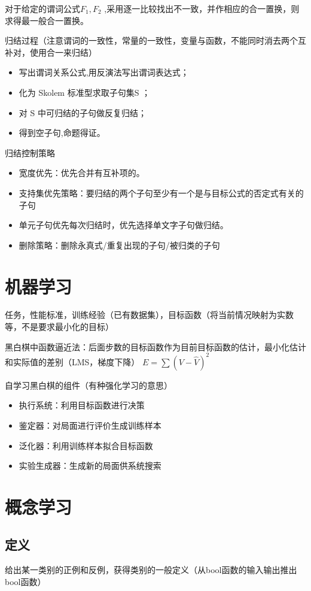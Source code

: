 \documentclass[UTF8,a4paper,landscape,16pt]{paper}
\begin{document}
\begin{multicols}{4}
\noindent 对于给定的谓词公式$F_{1},F_{2}$ ,采用逐一比较找出不一致，并作相应的合一置换，则求得最一般合一置换。

\noindent 归结过程（注意谓词的一致性，常量的一致性，变量与函数，不能同时消去两个互补对，使用合一来归结）
\begin{itemize}
\item 写出谓词关系公式,用反演法写出谓词表达式；
\item 化为 Skolem 标准型求取子句集S ；
\item 对 S 中可归结的子句做反复归结；
\item 得到空子句,命题得证。
\end{itemize}

\noindent 归结控制策略
\begin{itemize}
\item 宽度优先：优先合并有互补项的。
\item 支持集优先策略：要归结的两个子句至少有一个是与目标公式的否定式有关的子句
\item 单元子句优先每次归结时，优先选择单文字子句做归结。
\item 删除策略：删除永真式/重复出现的子句/被归类的子句
\end{itemize}
\section{机器学习}
\noindent 任务，性能标准，训练经验（已有数据集），目标函数（将当前情况映射为实数等，不是要求最小化的目标）

\noindent 黑白棋中函数逼近法：后面步数的目标函数作为目前目标函数的估计，最小化估计和实际值的差别（LMS，梯度下降）
$E=\sum(V-\hat{V})^2 $

\noindent 自学习黑白棋的组件（有种强化学习的意思）
\begin{itemize}
\item 执行系统：利用目标函数进行决策
\item 鉴定器：对局面进行评价生成训练样本
\item 泛化器：利用训练样本拟合目标函数
\item 实验生成器：生成新的局面供系统搜索
\end{itemize}
\section{概念学习}
\subsection{定义}
\noindent 给出某一类别的正例和反例，获得类别的一般定义（从bool函数的输入输出推出bool函数）


\end{multicols}
\end{document}
